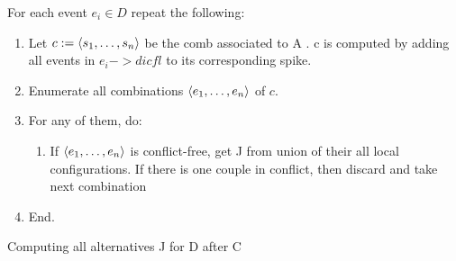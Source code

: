 \documentclass{llncs}
\begin{document}
\begin{algorithm}
\noindent
For each event $e_i \in D$ repeat the following:
\begin{enumerate}
\item
	Let $c \mathrel{:=} \langle s_1, \ldots, s_n\rangle$ be the comb associated to A . 
	c is computed by adding all events in $e_i->dicfl$ to its corresponding spike.

\item
	Enumerate all combinations $\langle e_1, \ldots, e_n\rangle$ of $c$.
\item
	For any of them, do:
	\begin{enumerate}
\item 
    	If $\langle e_1, \ldots, e_n\rangle$ is conflict-free, get J from union of their all local configurations.
	    If there is one couple in conflict, then discard and take next combination
	\end{enumerate}
\item End.
\end{enumerate}
\caption{Computing all alternatives J for D after C}
\label{a:alter}
\end{algorithm}
\end{document}
